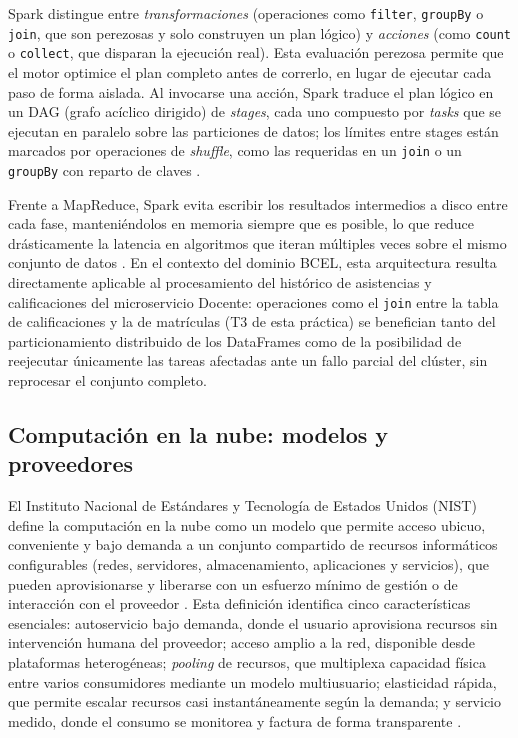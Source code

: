 \documentclass[11pt,a4paper]{article}
\begin{document}
Spark distingue entre \textit{transformaciones} (operaciones como
\texttt{filter}, \texttt{groupBy} o \texttt{join}, que son perezosas y solo
construyen un plan lógico) y \textit{acciones} (como \texttt{count} o
\texttt{collect}, que disparan la ejecución real). Esta evaluación perezosa
permite que el motor optimice el plan completo antes de correrlo, en lugar de
ejecutar cada paso de forma aislada. Al invocarse una acción, Spark traduce el
plan lógico en un DAG (grafo acíclico dirigido) de \textit{stages}, cada uno
compuesto por \textit{tasks} que se ejecutan en paralelo sobre las particiones
de datos; los límites entre stages están marcados por operaciones de
\textit{shuffle}, como las requeridas en un \texttt{join} o un
\texttt{groupBy} con reparto de claves \cite{chambers2018}.

Frente a MapReduce, Spark evita escribir los resultados intermedios a disco
entre cada fase, manteniéndolos en memoria siempre que es posible, lo que
reduce drásticamente la latencia en algoritmos que iteran múltiples veces
sobre el mismo conjunto de datos \cite{zaharia2012}. En el contexto del
dominio BCEL, esta arquitectura resulta directamente aplicable al
procesamiento del histórico de asistencias y calificaciones del microservicio
Docente: operaciones como el \texttt{join} entre la tabla de calificaciones y
la de matrículas (T3 de esta práctica) se benefician tanto del particionamiento
distribuido de los DataFrames como de la posibilidad de reejecutar únicamente
las tareas afectadas ante un fallo parcial del clúster, sin reprocesar el
conjunto completo.

\subsection{Computación en la nube: modelos y proveedores}
\label{sec:cloud}

El Instituto Nacional de Estándares y Tecnología de Estados Unidos (NIST)
define la computación en la nube como un modelo que permite acceso ubicuo,
conveniente y bajo demanda a un conjunto compartido de recursos informáticos
configurables (redes, servidores, almacenamiento, aplicaciones y servicios),
que pueden aprovisionarse y liberarse con un esfuerzo mínimo de gestión o de
interacción con el proveedor \cite{mell2011}. Esta definición identifica cinco
características esenciales: autoservicio bajo demanda, donde el usuario
aprovisiona recursos sin intervención humana del proveedor; acceso amplio a
la red, disponible desde plataformas heterogéneas; \textit{pooling} de
recursos, que multiplexa capacidad física entre varios consumidores mediante
un modelo multiusuario; elasticidad rápida, que permite escalar recursos casi
instantáneamente según la demanda; y servicio medido, donde el consumo se
monitorea y factura de forma transparente \cite{mell2011}.
\end{document}
